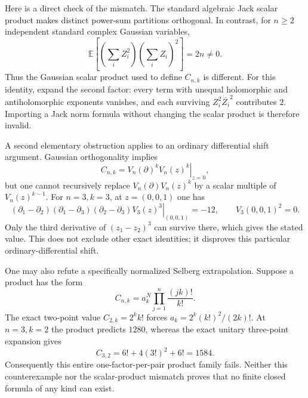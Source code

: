 \documentclass[11pt]{article}
\theoremstyle{remark}
\numberwithin{equation}{section}
\begin{document}
Here is a direct check of the mismatch. The standard algebraic Jack
scalar product makes distinct power-sum partitions orthogonal. In
contrast, for $n\ge2$ independent standard complex Gaussian variables,
\[
 \mathbb E\left[\left(\sum_iZ_i^2\right)
 \overline{\left(\sum_iZ_i\right)^2}\right]=2n\ne0.
\]
Thus the Gaussian scalar product used to define $C_{n,k}$ is different.
For this identity, expand the second factor: every term with unequal
holomorphic and antiholomorphic exponents vanishes, and each surviving
$Z_i^2\overline{Z_i}^2$ contributes $2$. Importing a Jack norm formula
without changing the scalar product is therefore invalid.

A second elementary obstruction applies to an ordinary differential
shift argument. Gaussian orthogonality implies
\[
 C_{n,k}=\left.V_n(\partial)^kV_n(z)^k\right|_{z=0},
\]
but one cannot recursively replace
$V_n(\partial)V_n(z)^k$ by a scalar multiple of $V_n(z)^{k-1}$.
For $n=3,k=3$, at $z=(0,0,1)$ one has
\[
 \left.(\partial_1-\partial_2)(\partial_1-\partial_3)
 (\partial_2-\partial_3)V_3(z)^3\right|_{(0,0,1)}=-12,
 \qquad V_3(0,0,1)^2=0.
\]
Only the third derivative of $(z_1-z_2)^3$ can survive there, which
gives the stated value. This does not exclude other exact identities;
it disproves this particular ordinary-differential shift.

One may also refute a specifically normalized Selberg extrapolation.
Suppose a product has the form
\[
 C_{n,k}=a_k^{N}\prod_{j=1}^n\frac{(jk)!}{k!}.
\]
The exact two-point value $C_{2,k}=2^kk!$ forces
$a_k=2^k(k!)^2/(2k)!$. At $n=3,k=2$ the product predicts $1280$,
whereas the exact unitary three-point expansion gives
\[
 C_{3,2}=6!+4(3!)^2+6!=1584.
\]
Consequently this entire one-factor-per-pair product family fails.
Neither this counterexample nor the scalar-product mismatch proves
that no finite closed formula of any kind can exist.
\end{document}

